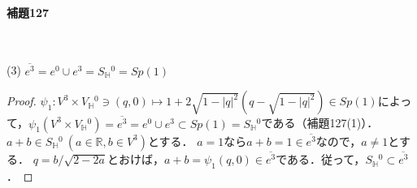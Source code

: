 \documentclass[a4paper, leqno]{ltjsreport}
\begin{document}
\paragraph{補題127}~
\begin{screen}
  (3) $\overline{e^3} = e^0 \cup e^3 = S_\mathbb{H}{}^0 = Sp(1)$
\end{screen}
\begin{proof}
  $\psi_1 \colon V^3 \times V_\mathbb{H}{}^0 \ni (q, 0) \mapsto 1 + 2\sqrt{1-\lvert q\rvert^2}(q - \sqrt{1-\lvert q\rvert^2}) \in Sp(1)$によって，$\psi_1(V^3 \times V_\mathbb{H}{}^0) = \overline{e^3} = e^0 \cup e^3 \subset Sp(1) = S_\mathbb{H}{}^0$である（補題127(1)）．
  $a + b \in S_\mathbb{H}{}^0 \ (a \in \mathbb{R}, b \in V^3)$とする．
  $a=1$なら$a + b = 1 \in \overline{e^3}$なので，$a \neq 1$とする．
  $q = b / \sqrt{2 - 2a}$とおけば，$a + b = \psi_1(q, 0) \in \overline{e^3}$である．従って，$S_\mathbb{H}{}^0 \subset \overline{e^3}$．
\end{proof}
\end{document}
